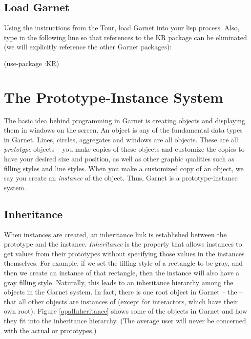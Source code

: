 \section{Load Garnet}

Using the instructions from the Tour, load Garnet into your lisp
process.  Also, type in the following line so that references to
the KR package can be eliminated (we will explicitly reference the
other Garnet packages):

\begin{programexample}
(use-package :KR)
\end{programexample}


\chapter{The Prototype-Instance System}

The basic idea behind programming in Garnet is creating objects
and displaying them in windows on the screen.
An object is any of the fundamental data types in Garnet.  Lines,
circles, aggregates and windows are all objects.  These are all
{\it prototype} objects -- you make copies of these objects and
customize the copies to have your desired size and position, as well
as other graphic qualities such as filling styles and line styles.
When you make a customized copy of an object, we say you create an
{\it instance} of the object.  Thus, Garnet is a prototype-instance system.


\section{Inheritance}
\label{inheritance}

When instances are created, an inheritance link is established between
the prototype and the instance.  {\it Inheritance} is the property that
allows instances to get values from their prototypes without specifying
those values in the instances themselves.  For example, if we set the
filling style of a rectangle to be gray, and then we create an
instance of that rectangle, then the instance will also have a gray
filling style.  Naturally, this leads to an inheritance hierarchy
among the objects in the Garnet system.
In fact, there is one root object in Garnet -- the  -- that
all other objects are instances of (except for interactors, which have
their own root).  Figure \ref{opalInheritance}
shows some of the objects in Garnet and how they fit into the
inheritance hierarchy.  (The average user will never be concerned with
the actual  or  prototypes.)

